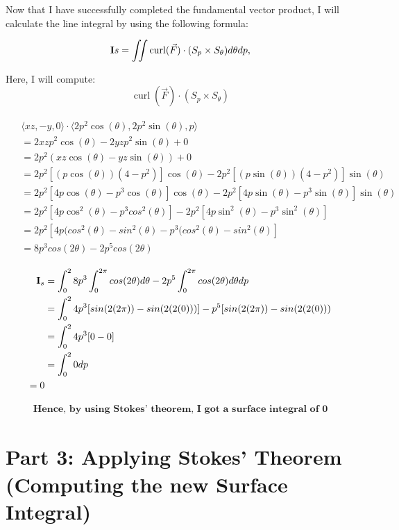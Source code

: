 \documentclass[a4paper]{article}
\begin{document}
Now that I have successfully completed the fundamental vector product, I will calculate the line integral by using the following formula:

\begin{equation}
    \text{\textbf{I}}s = \iint \operatorname{curl}(\vec{F} ) \cdot (S_p \times S_\theta) d\theta dp,
\end{equation}

Here, I will compute: $$\operatorname{curl}(\vec{F} ) \cdot (S_p \times S_\theta)$$

\begin{align}
    \begin{split}
    &\langle xz, -y, 0 \rangle \cdot \langle 2p^2\cos(\theta), 2p^2\sin(\theta), p \rangle \\
    &= 2xzp^2\cos(\theta) - 2yzp^2\sin(\theta) + 0 \\
    &= 2p^2(xz\cos(\theta) - yz\sin(\theta)) + 0 \\
    &= 2p^2[(p\cos(\theta))(4-p^2)]\cos(\theta) - 2p^2[(p\sin(\theta))(4 - p^2)]\sin(\theta) \\
    &= 2p^2[4p\cos(\theta)-p^3\cos(\theta)]\cos(\theta) - 2p^2[4p\sin(\theta) - p^3\sin(\theta)]\sin(\theta) \\
    &= 2p^2[4p\cos^2(\theta)-p^3cos^2(\theta)] - 2p^2[4p\sin^2(\theta) - p^3\sin^2(\theta)]\\
    &= 2p^2[4p(cos^2(\theta)-sin^2(\theta) - p^3(cos^2(\theta) - sin^2(\theta)] \\
    &= 8p^3cos(2\theta) - 2p^5cos(2\theta)
    \end{split}
\end{align}


\begin{align}
    \text{\textbf{I}}_s &=\int_0^{2} 8p^3 \int_0^{2\pi}cos(2\theta) d\theta - 2p^5 \int_0^{2\pi}cos(2\theta) d\theta dp \\
    &= \int_0^2 4p^3[sin(2(2\pi)) - sin(2(2(0)))] - p^5 [sin(2(2\pi)) - sin(2(2(0)))\\
    &= \int_0^2 4p^3[0-0] \\
    &= \int_0^2 0 dp \\
    = 0 \\ 
\end{align}

\begin{align}
    \textbf{Hence, by using Stokes' theorem, I got a surface integral of 0}
\end{align}

\section{Part 3: Applying Stokes’ Theorem (Computing the new Surface Integral)}
\end{document}
